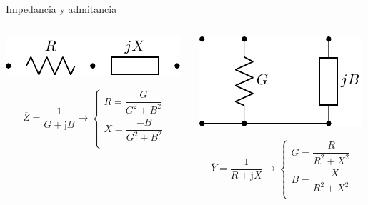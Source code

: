 \documentclass[aspectratio=169, usenames,svgnames,dvipsnames]{beamer}
\begin{document}

\begin{frame}{Impedancia y admitancia}
    \begin{columns}
    \begin{column}{0.5\columnwidth}

    \vspace{4mm}
    \begin{center}
        \includegraphics[height=0.12\textheight]{../figs/Z.pdf}
    \end{center}

    \vspace{7mm}
    \[
      \overline{Z} = \frac{1}{G + \mathrm{j} B} \rightarrow \left\{%
          \begin{array}{l}
        	R = \dfrac{G}{G^2 + B^2}\\[5mm] %
        	X = \dfrac{-B}{G^2 + B^2}\\
          \end{array}\right.        
    \]
    \end{column}
    
    \begin{column}{0.5\columnwidth}
    \begin{center}
        \includegraphics[height=0.25\textheight]{../figs/Y.pdf}
    \end{center}
    
    \[
      \overline{Y} = \frac{1}{R + \mathrm{j} X} \rightarrow \left\{%
          \begin{array}{l}
        	G = \dfrac{R}{R^2 + X^2}\\[5mm]
        	B = \dfrac{-X}{R^2 + X^2}\\
          \end{array}\right.        
    \]
    \end{column}
    \end{columns}
\end{frame}
\end{document}
